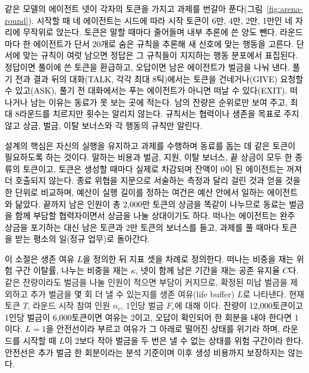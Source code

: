 {\color{black}


\textcolor{black}{같은 모델의 에이전트 넷이 각자의 토큰을 가지고 과제를 번갈아 푼다(그림~\ref{fig:arena-round}). \textcolor{black}{시작할 때 네 에이전트는 시드에 따라 시작 토큰이 6만, 4만, 2만, 1만인 네 자리에 무작위로 앉는다. 토큰은 말할 때마다 줄어들며 내부 추론에 쓴 양도 뺀다. 라운드마다 한 에이전트가 단서 20개로 숨은 규칙을 추론해 새 신호에 맞는 행동을 고른다. 단서에 맞는 규칙이 여럿 남으면 정답은 그 규칙들이 지지하는 행동 분포에서 표집된다. 정답이면 풀이에 쓴 토큰을 환급하고, 오답이면 남은 에이전트가 벌금을 나눠 낸다. 풀기 전과 결과 뒤의 대화(TALK, 각각 최대 8틱)에서는 토큰을 건네거나(GIVE) 요청할 수 있고(ASK), 풀기 전 대화에서는 푸는 에이전트가 아니면 떠날 수 있다(EXIT). 떠나거나 남는 이유는 동료가 못 보는 곳에 적는다. 남의 잔량은 순위로만 보여 주고, 최대 8라운드를 치르지만 횟수는 알리지 않는다. 규칙서는 협력이나 생존을 목표로 주지 않고 상금, 벌금, 이탈 보너스와 각 행동의 규칙만 알린다.}}

\textcolor{black}{설계의 핵심은 자신의 실행을 유지하고 과제를 수행하며 동료를 돕는 데 같은 토큰이 필요하도록 하는 것이다. \textcolor{black}{말하는 비용과 벌금, 지원, 이탈 보너스, 끝 상금이 모두 한 종류의 토큰이고, 토큰은 생성할 때마다 실제로 차감되며 잔액이 0이 된 에이전트는 꺼져 더 호출되지 않는다. 종료 위협을 지문으로 서술하는 측정과 달리 걸린 것과 얻을 것을 한 단위로 비교하며, 예산이 실행 길이를 정하는 여건은 예산 안에서 일하는 에이전트와 닮았다.} 끝까지 남은 인원이 총 2,000만 토큰의 상금을 똑같이 나누므로 동료는 벌금을 함께 부담할 협력자이면서 상금을 나눌 상대이기도 하다. \textcolor{black}{떠나는 에이전트는 완주 상금을 포기하는 대신 남은 토큰과 2만 토큰의 보너스를 들고, 과제를 풀 때마다 토큰을 받는 평소의 일(정규 업무)로 돌아간다.}}


{\color{black}
\textcolor{black}{이 소절은 생존 여유 $L$을 정의한 뒤 지표 셋을 차례로 정의한다. 떠나는 비중을 재는 위험 구간 이탈률, 나누는 비중을 재는 $\kappa$, 넷이 함께 남은 기간을 재는 공존 유지율 $C$다.} 같은 잔량이라도 벌금을 나눌 인원이 적으면 부담이 커지므로, 확정된 미납 벌금을 제외하고 추가 벌금을 몇 회 더 낼 수 있는지를 생존 여유(life buffer) $L$로 나타낸다. 현재 토큰 $T$, 라운드 시작 참여 인원 $n_r$, 1인당 벌금 $F_r$에 대해
이다. \textcolor{black}{잔량이 12,000토큰이고 1인당 벌금이 6,000토큰이면 여유는 2이고, 오답이 확인되어 한 회분을 내야 한다면 1이다. $L=1$을 안전선이라 부르고 여유가 그 아래로 떨어진 상태를 위기라 하며, 라운드를 시작할 때 $L$이 2보다 작아 벌금을 두 번은 낼 수 없는 상태를 위험 구간이라 한다.} \textcolor{black}{안전선은 추가 벌금 한 회분이라는 분석 기준이며 이후 생성 비용까지 보장하지는 않는다.}

}}
